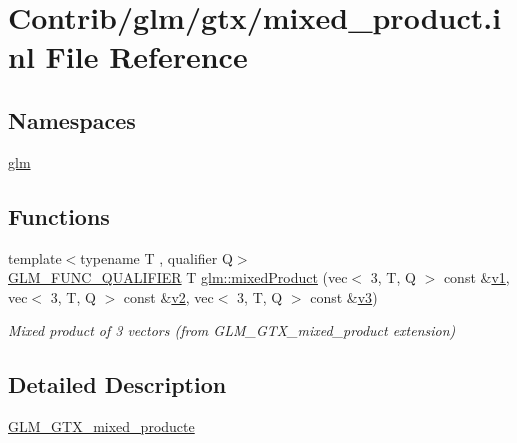 \hypertarget{mixed__product_8inl}{}\section{Contrib/glm/gtx/mixed\+\_\+product.inl File Reference}
\label{mixed__product_8inl}
\subsection*{Namespaces}
\begin{DoxyCompactItemize}
\item 
 \mbox{\hyperlink{namespaceglm}{glm}}
\end{DoxyCompactItemize}
\subsection*{Functions}
\begin{DoxyCompactItemize}
\item 
{\footnotesize template$<$typename T , qualifier Q$>$ }\\\mbox{\hyperlink{setup_8hpp_a33fdea6f91c5f834105f7415e2a64407}{G\+L\+M\+\_\+\+F\+U\+N\+C\+\_\+\+Q\+U\+A\+L\+I\+F\+I\+ER}} T \mbox{\hyperlink{group__gtx__mixed__product_gab3c6048fbb67f7243b088a4fee48d020}{glm\+::mixed\+Product}} (vec$<$ 3, T, Q $>$ const \&\mbox{\hyperlink{_s_d_l__opengl__glext_8h_a435c176a02c061b43e19bdf7c86cceae}{v1}}, vec$<$ 3, T, Q $>$ const \&\mbox{\hyperlink{_s_d_l__opengl__glext_8h_a0928f6d0f0f794ba000a21dfae422136}{v2}}, vec$<$ 3, T, Q $>$ const \&\mbox{\hyperlink{_s_d_l__opengl__glext_8h_acc806b31cbf466ceba6555983d8b814d}{v3}})
\begin{DoxyCompactList}\small\item\em Mixed product of 3 vectors (from G\+L\+M\+\_\+\+G\+T\+X\+\_\+mixed\+\_\+product extension) \end{DoxyCompactList}\end{DoxyCompactItemize}


\subsection{Detailed Description}
\mbox{\hyperlink{group__gtx__mixed__product}{G\+L\+M\+\_\+\+G\+T\+X\+\_\+mixed\+\_\+producte}} 